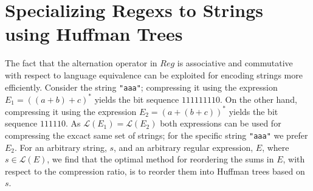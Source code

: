 \documentclass[a4paper, oneside]{memoir}
\theoremstyle{definition}
\newtheorem{lemma}{Lemma}
\begin{document}



\section{Specializing Regexs to Strings using Huffman Trees}

The fact that the alternation operator in $Reg$ is associative and commutative with respect to language equivalence can be exploited for encoding strings more efficiently. Consider the string \texttt{"aaa"}; compressing it using the expression $E_1 = ((a + b) + c)^{*}$ yields the bit sequence $111111110$. On the other hand, compressing it using the expression $E_2 = (a + (b + c))^{*}$ yields the bit sequence $111110$. As $\mathcal{L}(E_1) = \mathcal{L}(E_2)$ both expressions can be used for compressing the excact same set of strings; for the specific string \texttt{"aaa"} we prefer $E_2$. For an arbitrary string, $s$, and an arbitrary regular expression, $E$, where $s \in \mathcal{L}(E)$, we find that the optimal method for reordering the sums in $E$, with respect to the compression ratio, is to reorder them into Huffman trees based on $s$.
\end{document}
